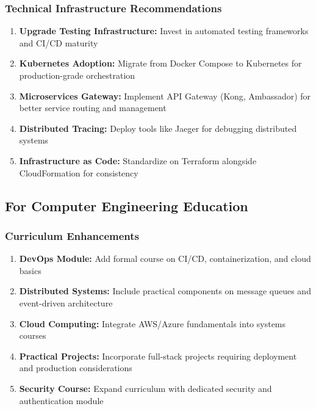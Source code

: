 \subsubsection{Technical Infrastructure Recommendations}

\begin{enumerate}
    \item \textbf{Upgrade Testing Infrastructure:} Invest in automated testing frameworks and CI/CD maturity
    
    \item \textbf{Kubernetes Adoption:} Migrate from Docker Compose to Kubernetes for production-grade orchestration
    
    \item \textbf{Microservices Gateway:} Implement API Gateway (Kong, Ambassador) for better service routing and management
    
    \item \textbf{Distributed Tracing:} Deploy tools like Jaeger for debugging distributed systems
    
    \item \textbf{Infrastructure as Code:} Standardize on Terraform alongside CloudFormation for consistency
\end{enumerate}

\subsection{For Computer Engineering Education}

\subsubsection{Curriculum Enhancements}

\begin{enumerate}
    \item \textbf{DevOps Module:} Add formal course on CI/CD, containerization, and cloud basics
    
    \item \textbf{Distributed Systems:} Include practical components on message queues and event-driven architecture
    
    \item \textbf{Cloud Computing:} Integrate AWS/Azure fundamentals into systems courses
    
    \item \textbf{Practical Projects:} Incorporate full-stack projects requiring deployment and production considerations
    
    \item \textbf{Security Course:} Expand curriculum with dedicated security and authentication module
\end{enumerate}

